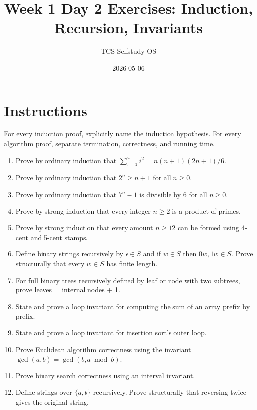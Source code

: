 \documentclass[11pt]{article}
\title{Week 1 Day 2 Exercises: Induction, Recursion, Invariants}
\author{TCS Selfstudy OS}
\date{2026-05-06}
\begin{document}
\maketitle

\section*{Instructions}
For every induction proof, explicitly name the induction hypothesis. For every algorithm proof, separate termination, correctness, and running time.

\begin{enumerate}[label=\textbf{D2.\arabic*.}]
\item Prove by ordinary induction that $\sum_{i=1}^n i^2=n(n+1)(2n+1)/6$.
\item Prove by ordinary induction that $2^n\ge n+1$ for all $n\ge0$.
\item Prove by ordinary induction that $7^n-1$ is divisible by $6$ for all $n\ge0$.
\item Prove by strong induction that every integer $n\ge2$ is a product of primes.
\item Prove by strong induction that every amount $n\ge12$ can be formed using 4-cent and 5-cent stamps.
\item Define binary strings recursively by $\epsilon\in S$ and if $w\in S$ then $0w,1w\in S$. Prove structurally that every $w\in S$ has finite length.
\item For full binary trees recursively defined by leaf or node with two subtrees, prove leaves = internal nodes + 1.
\item State and prove a loop invariant for computing the sum of an array prefix by prefix.
\item State and prove a loop invariant for insertion sort's outer loop.
\item Prove Euclidean algorithm correctness using the invariant $\gcd(a,b)=\gcd(b,a\bmod b)$.
\item Prove binary search correctness using an interval invariant.
\item Define strings over $\{a,b\}$ recursively. Prove structurally that reversing twice gives the original string.
\end{enumerate}
\end{document}
